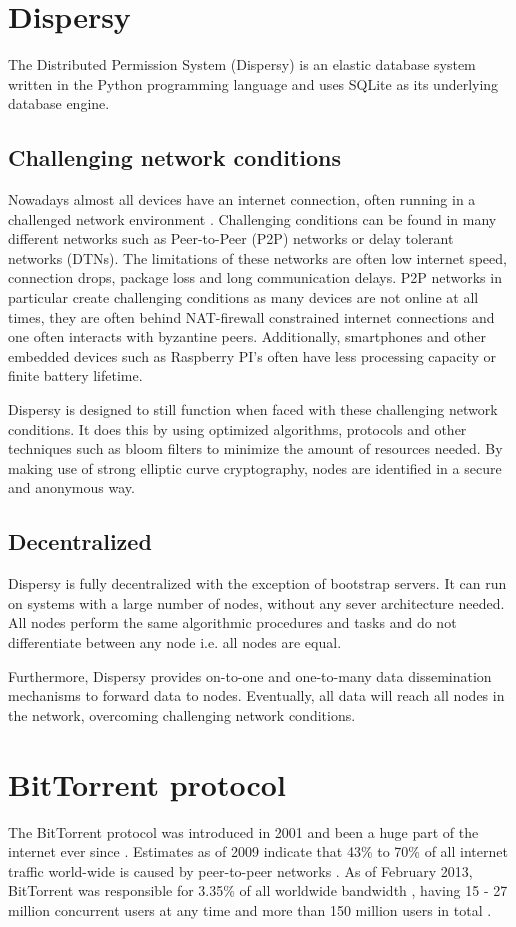 \section{Dispersy}
The Distributed Permission System (Dispersy) is an elastic database system written in the Python programming language and uses SQLite as its underlying database engine.

\subsection{Challenging network conditions}
Nowadays almost all devices have an internet connection, often running in a challenged network environment \cite{dispersy2016dispersy}.
Challenging conditions can be found in many different networks such as Peer-to-Peer (P2P) networks or delay tolerant networks (DTNs).
The limitations of these networks are often low internet speed, connection drops, package loss and long communication delays.
P2P networks in particular create challenging conditions as many devices are not online at all times, they are often behind NAT-firewall constrained internet connections and one often interacts with byzantine peers.
Additionally, smartphones and other embedded devices such as Raspberry PI's often have less processing capacity or finite battery lifetime.

Dispersy is designed to still function when faced with these challenging network conditions.
It does this by using optimized algorithms, protocols and other techniques such as bloom filters to minimize the amount of resources needed.
By making use of strong elliptic curve cryptography, nodes are identified in a secure and anonymous way.

\subsection{Decentralized}
Dispersy is fully decentralized with the exception of bootstrap servers.
It can run on systems with a large number of nodes, without any sever architecture needed.
All nodes perform the same algorithmic procedures and tasks and do not differentiate between any node i.e. all nodes are equal.

Furthermore, Dispersy provides on-to-one and one-to-many data dissemination mechanisms to forward data to nodes.
Eventually, all data will reach all nodes in the network, overcoming challenging network conditions.

\section{BitTorrent protocol}
The BitTorrent protocol was introduced in 2001 and been a huge part of the internet ever since \cite{Cohen2001BitTorrent}.
Estimates as of 2009 indicate that 43\% to 70\% of all internet traffic world-wide is caused by peer-to-peer networks \cite{schulze2009internet}.
As of February 2013, BitTorrent was responsible for 3.35\% of all worldwide bandwidth \cite{palo2013application}, having 15 - 27 million concurrent users at any time \cite{wang2013measuring} and more than 150 million users in total \cite{reuters2012bittorrent}.

